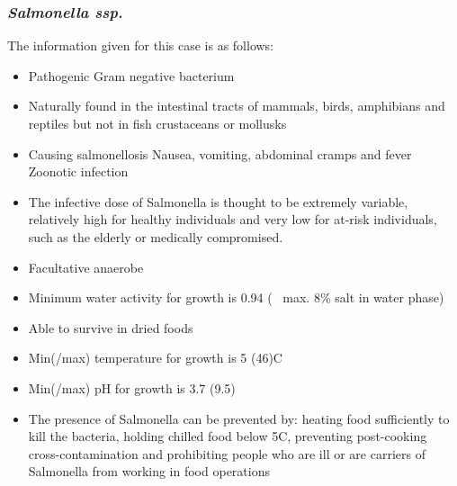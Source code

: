 \subsubsection{\textit{Salmonella ssp.}}
\begin{highlight}
    The information given for this case is as follows:

\begin{itemize}
\item Pathogenic Gram negative bacterium
\item Naturally found in the intestinal tracts of mammals, birds, amphibians and reptiles but not in fish crustaceans or mollusks
\item Causing salmonellosis
\subitem Nausea, vomiting, abdominal cramps and fever 
\subitem Zoonotic infection
\item The infective dose of Salmonella is thought to be extremely variable, relatively high for healthy individuals and very low for at-risk individuals, such as the elderly or medically compromised.
\item Facultative anaerobe
\item Minimum water activity for growth is 0.94
\subitem (~ max. 8\% salt in water phase)
\item Able to survive in dried foods
\item Min(/max) temperature for growth is 5 (46)\textdegree C
\item Min(/max) pH for growth is 3.7 (9.5)
\item The presence of Salmonella can be prevented by: heating food sufficiently to kill the bacteria, holding chilled food below 5\textdegree C, preventing post-cooking cross-contamination and prohibiting people who are ill or are carriers of Salmonella from working in food operations

\end{itemize}
\end{highlight}


